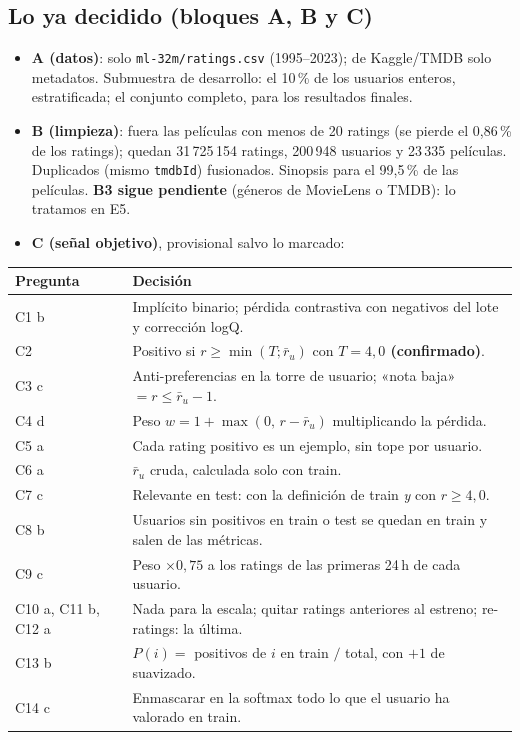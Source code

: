 \documentclass[a4paper,11pt]{article}
\begin{document}
\subsection{Lo ya decidido (bloques A, B y C)}
\begin{itemize}
  \item \textbf{A (datos)}: solo \texttt{ml-32m/ratings.csv} (1995--2023); de Kaggle/TMDB solo metadatos. Submuestra de
        desarrollo: el 10\,\% de los usuarios enteros, estratificada; el conjunto completo, para los resultados finales.
  \item \textbf{B (limpieza)}: fuera las películas con menos de 20 ratings (se pierde el 0,86\,\% de los ratings);
        quedan 31\,725\,154 ratings, 200\,948 usuarios y 23\,335 películas. Duplicados (mismo \texttt{tmdbId})
        fusionados. Sinopsis para el 99,5\,\% de las películas. \textbf{B3 sigue pendiente} (géneros de MovieLens o
        TMDB): lo tratamos en E5.
  \item \textbf{C (señal objetivo)}, provisional salvo lo marcado:
\end{itemize}
\begin{center}
\small
\begin{tabularx}{\linewidth}{lY}
\toprule
Pregunta & Decisión \\
\midrule
C1 b & Implícito binario; pérdida contrastiva con negativos del lote y corrección logQ. \\
C2 & Positivo si $r\ge\min(T;\bar r_u)$ con \textbf{$T=4{,}0$ (confirmado)}. \\
C3 c & Anti-preferencias en la torre de usuario; «nota baja» $=r\le\bar r_u-1$. \\
C4 d & Peso $w=1+\max(0,\,r-\bar r_u)$ multiplicando la pérdida. \\
C5 a & Cada rating positivo es un ejemplo, sin tope por usuario. \\
C6 a & $\bar r_u$ cruda, calculada solo con train. \\
C7 c & Relevante en test: con la definición de train \emph{y} con $r\ge4{,}0$. \\
C8 b & Usuarios sin positivos en train o test se quedan en train y salen de las métricas. \\
C9 c & Peso $\times0{,}75$ a los ratings de las primeras 24\,h de cada usuario. \\
C10 a, C11 b, C12 a & Nada para la escala; quitar ratings anteriores al estreno; re-ratings: la última. \\
C13 b & $P(i)=$ positivos de $i$ en train $/$ total, con $+1$ de suavizado. \\
C14 c & Enmascarar en la softmax todo lo que el usuario ha valorado en train. \\
\bottomrule
\end{tabularx}
\end{center}
\end{document}
